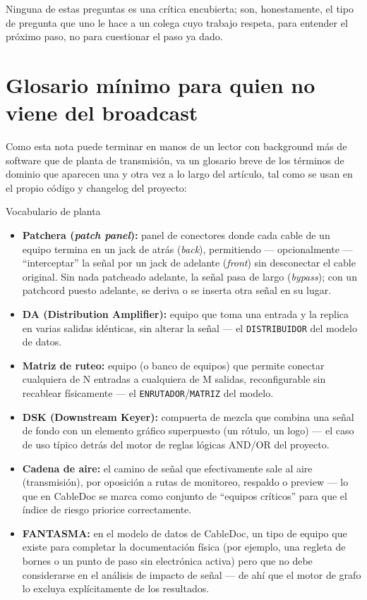 \documentclass[11pt,twocolumn]{article}
\begin{document}
Ninguna de estas preguntas es una crítica encubierta; son, honestamente, el tipo de pregunta que uno le hace a un colega cuyo trabajo respeta, para entender el próximo paso, no para cuestionar el paso ya dado.

\section{Glosario mínimo para quien no viene del broadcast}

Como esta nota puede terminar en manos de un lector con background más de software que de planta de transmisión, va un glosario breve de los términos de dominio que aparecen una y otra vez a lo largo del artículo, tal como se usan en el propio código y changelog del proyecto:

\begin{specbox}{Vocabulario de planta}
\begin{itemize}[leftmargin=1.1em,itemsep=2pt,topsep=2pt]
\item \textbf{Patchera (\emph{patch panel}):} panel de conectores donde cada cable de un equipo termina en un jack de atrás (\emph{back}), permitiendo --- opcionalmente --- ``interceptar'' la señal por un jack de adelante (\emph{front}) sin desconectar el cable original. Sin nada patcheado adelante, la señal pasa de largo (\emph{bypass}); con un patchcord puesto adelante, se deriva o se inserta otra señal en su lugar.
\item \textbf{DA (Distribution Amplifier):} equipo que toma una entrada y la replica en varias salidas idénticas, sin alterar la señal --- el \texttt{DISTRIBUIDOR} del modelo de datos.
\item \textbf{Matriz de ruteo:} equipo (o banco de equipos) que permite conectar cualquiera de N entradas a cualquiera de M salidas, reconfigurable sin recablear físicamente --- el \texttt{ENRUTADOR}/\texttt{MATRIZ} del modelo.
\item \textbf{DSK (Downstream Keyer):} compuerta de mezcla que combina una señal de fondo con un elemento gráfico superpuesto (un rótulo, un logo) --- el caso de uso típico detrás del motor de reglas lógicas AND/OR del proyecto.
\item \textbf{Cadena de aire:} el camino de señal que efectivamente sale al aire (transmisión), por oposición a rutas de monitoreo, respaldo o preview --- lo que en CableDoc se marca como conjunto de ``equipos críticos'' para que el índice de riesgo priorice correctamente.
\item \textbf{FANTASMA:} en el modelo de datos de CableDoc, un tipo de equipo que existe para completar la documentación física (por ejemplo, una regleta de bornes o un punto de paso sin electrónica activa) pero que no debe considerarse en el análisis de impacto de señal --- de ahí que el motor de grafo lo excluya explícitamente de los resultados.
\end{itemize}
\end{specbox}
\end{document}
